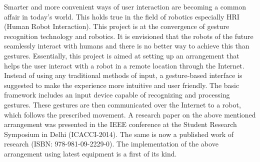 
Smarter and more convenient ways of user interaction are becoming a common affair in today's world. This holds true in the field of robotics especially HRI (Human Robot Interaction). This project is at the convergence of gesture recognition technology and robotics. It is envisioned that the robots of the future seamlessly interact with humans and there is no better way to achieve this than gestures. \linebreak \linebreak
Essentially, this project is aimed at setting up an arrangement that helps the user interact with a robot in a remote location through the Internet. Instead of using any traditional methods of input, a gesture-based interface is suggested to make the experience more intuitive and user friendly. The basic framework includes an input device capable of recognizing and processing gestures. These gestures are then communicated over the Internet to a robot, which follows the prescribed movement. \linebreak \linebreak
A research paper on the above mentioned arrangement was presented in the IEEE conference at the Student Research Symposium in Delhi (ICACCI-2014). The same is now a published work of research (ISBN: 978-981-09-2229-0). The implementation of the above arrangement using latest equipment is a first of its kind. 
 



